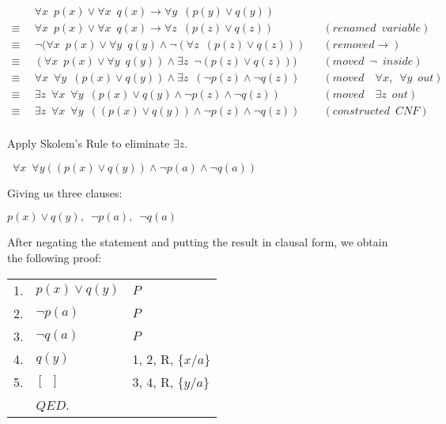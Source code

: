 \documentclass[12pt]{article}
\begin{document}
\begin{align*}
& \forall x \enspace p(x) \lor \forall x \enspace q(x) \rightarrow \forall y \enspace (p(y) \lor q(y)) \\
        \equiv \enspace & \forall x \enspace p(x) \lor \forall x \enspace q(x)
                          \rightarrow \forall z \enspace (p(z) \lor q(z))      && (renamed \enspace variable) \\
        \equiv \enspace & \neg(\forall x \enspace p(x) \lor \forall y \enspace q(y) 
                          \land \neg (\forall z \enspace (p(z) \lor q(z)))      &&  (removed \rightarrow) \\
        \equiv \enspace & (\forall x \enspace p(x) \lor \forall y \enspace q(y)) \land 
                          \exists z \enspace \neg (p(z) \lor q(z))) && (moved \enspace \neg \enspace inside) \\
        \equiv \enspace & \forall x \enspace \forall y \enspace (p(x) \lor q(y)) \land \exists z \enspace
                          (\neg p(z) \land \neg q(z))
                                      && (moved\enspace \enspace \forall x, \enspace \forall y \enspace out) \\
        \equiv \enspace & \exists z \enspace \forall x \enspace \forall y \enspace (p(x) \lor q(y) 
                          \land \neg p(z) \land \neg q(z))  && (moved\enspace \enspace \exists z \enspace out) \\
        \equiv \enspace & \exists z \enspace \forall x \enspace \forall y \enspace ((p(x) \lor q(y))
                          \land \neg p(z) \land \neg q(z)) && (constructed \enspace CNF) \\
\end{align*}

Apply Skolem's Rule to eliminate $\exists z$.

\begin{center}
    $\enspace \forall x \enspace \forall y ((p(x) \lor q(y)) \land \neg p(a) \land \neg q(a))$
\end{center}

Giving us three clauses:

\begin{center}
     $p(x) \lor q(y), \enspace \neg p(a), \enspace \neg q(a)$
\end{center}
 
After negating the statement and putting the result in clausal form, we obtain the following proof:

\begin{tabular}{p{.8cm}p{8.5cm}l}
1.  & $p(x) \lor q(y)$     & $P$ \\
2.  & $\neg p(a)$          & $P$ \\
3.  & $\neg q(a)$          & $P$ \\
4.  & $q(y)$               & 1, 2, R, $ \{ x / a \}$ \\   
5.  & $[ \enspace ]$       & 3, 4, R, $ \{ y / a \}$ \\
& $QED$. \\
\end{tabular}
\end{document}
